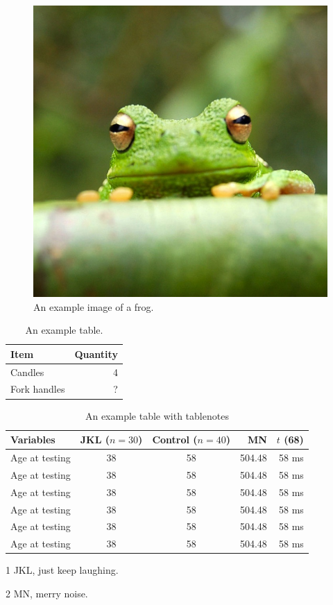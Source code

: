 \documentclass[fleqn,10pt]{physiome}
\begin{document}
\begin{figure}[ht]\centering
\includegraphics[width=0.5\linewidth]{frog}
\caption{An example image of a frog.}
\label{fig:view}
\end{figure}

\begin{table}[ht]\centering
\caption{An example table.}\label{tab:widgets}
\begin{tabular}{l r}
\toprule
Item & Quantity \\\midrule
Candles & 4 \\
Fork handles & ?\\
\bottomrule
\end{tabular}
\end{table}

\begin{table}[hbt!]\centering
\begin{threeparttable}
\caption{An example table with tablenotes}\label{tab:withnotes}

\begin{tabular}{lccrr}
\toprule
Variables & JKL ($n=30$) & Control ($n=40$) & MN & $t$ (68)\\
\midrule
Age at testing & 38 & 58\tnote{1} & 504.48 & 58 ms\\
Age at testing & 38 & 58 & 504.48 & 58 ms\\
Age at testing & 38 & 58 & 504.48 & 58 ms\\
Age at testing & 38 & 58 & 504.48 & 58 ms\\
Age at testing\tnote{2} & 38 & 58 & 504.48 & 58 ms\\
Age at testing & 38 & 58 & 504.48 & 58 ms\\
\bottomrule
\end{tabular}
\begin{tablenotes}
\item[1] JKL, just keep laughing.
\item[2] MN, merry noise.
\end{tablenotes}
\end{threeparttable}
\end{table}
\end{document}

